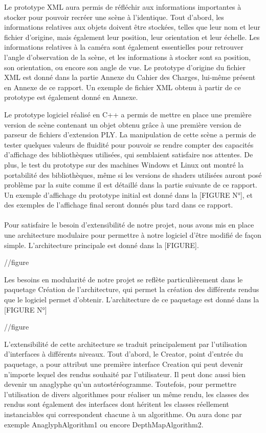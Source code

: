 Le prototype XML aura permis de réfléchir aux informations importantes à stocker pour pouvoir recréer une scène à l'identique. Tout d'abord, les informations relatives aux objets doivent être stockées, telles que leur nom et leur fichier d'origine, mais également leur position, leur orientation et leur échelle. Les informations relatives à la caméra sont également essentielles pour retrouver l'angle d'observation de la scène, et les informations à stocker sont sa position, son orientation, ou encore son angle de vue. Le prototype d'origine du fichier XML est donné dans la partie Annexe du Cahier des Charges, lui-même présent en Annexe de ce rapport. Un exemple de fichier XML obtenu à partir de ce prototype est également donné en Annexe.

Le prototype logiciel réalisé en C++ a permis de mettre en place une première version de scène contenant un objet obtenu grâce à une première version de parseur de fichiers d'extension PLY. La manipulation de cette scène a permis de tester quelques valeurs de fluidité pour pouvoir se rendre compter des capacités d'affichage des bibliothèques utilisées, qui semblaient satisfaire nos attentes. De plus, le test du prototype sur des machines Windows et Linux ont montré la portabilité des bibliothèques, même si les versions de shaders utilisées auront posé problème par la suite comme il est détaillé dans la partie suivante de ce rapport. Un exemple d'affichage du prototype initial est donné dans la [FIGURE N°], et des exemples de l'affichage final seront donnés plus tard dans ce rapport.

\paragraph{}
Pour satisfaire le besoin d'extensibilité de notre projet, nous avons mis en place une architecture modulaire pour permettre à notre logiciel d'être modifié de façon simple. L'architecture principale est donné dans la [FIGURE].

//figure

Les besoins en modularité de notre projet se reflète particulièrement dans le paquetage Création de l'architecture, qui permet la création des différents rendus que le logiciel permet d'obtenir. L'architecture de ce paquetage est donné dans la [FIGURE N°]

//figure

L'extensibilité de cette architecture se traduit principalement par l'utilisation d'interfaces à différents niveaux. Tout d'abord, le Creator, point d'entrée du paquetage, a pour attribut une première interface Creation qui peut devenir n'importe lequel des rendus souhaité par l'utilisateur. Il peut donc aussi bien devenir un anaglyphe qu'un autostéréogramme. Toutefois, pour permettre l'utilisation de divers algorithmes pour réaliser un même rendu, les classes des rendus sont également des interfaces dont héritent les classes réellement instanciables qui correspondent chacune à un algorithme. On aura donc par exemple AnaglyphAlgorithm1 ou encore DepthMapAlgorithm2.
